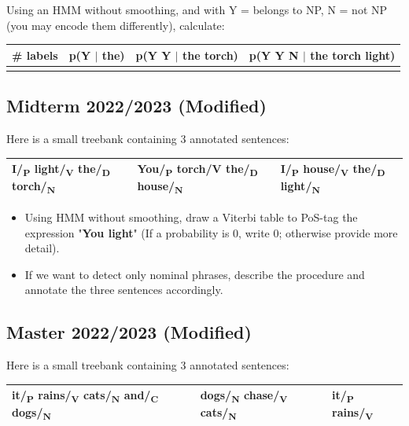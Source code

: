 \documentclass{../extra/aakpract/aakpract}
\begin{document}
	Using an HMM without smoothing, and with Y = belongs to NP, N = not NP (you may encode them differently), calculate:
	
	\begin{center}
		\begin{tabular}{|l|l|l|l|}
			\hline
			\# labels & p(Y $|$ the) & p(Y Y $|$ the torch) & p(Y Y N $|$ the torch light) \\
			\hline
			&&&\\
			\hline
		\end{tabular}
	\end{center}
	
	
	\subsection{Midterm 2022/2023 (Modified)}
	
	Here is a small treebank containing 3 annotated sentences:
	\begin{center}
		\begin{tabular}{|l|l|l|}
			\hline
			I/\textsubscript{P} light/\textsubscript{V} the/\textsubscript{D} torch/\textsubscript{N} &
			You/\textsubscript{P} torch/V the/\textsubscript{D} house/\textsubscript{N} &
			I/\textsubscript{P} house/\textsubscript{V} the/\textsubscript{D} light/\textsubscript{N} \\
			\hline
		\end{tabular}
	\end{center}
	
	\begin{itemize}
		\item Using HMM without smoothing, draw a Viterbi table to PoS-tag the expression "\textbf{You light}" (If a probability is 0, write 0; otherwise provide more detail).
		\item If we want to detect only nominal phrases, describe the procedure and annotate the three sentences accordingly.
	\end{itemize}
	
	
	\subsection{Master 2022/2023 (Modified)}
	
	Here is a small treebank containing 3 annotated sentences:
	\begin{center}
		\begin{tabular}{|l|l|l|}
			\hline
			it/\textsubscript{P} rains/\textsubscript{V} cats/\textsubscript{N} and/\textsubscript{C} dogs/\textsubscript{N} &
			dogs/\textsubscript{N} chase/\textsubscript{V} cats/\textsubscript{N} &
			it/\textsubscript{P} rains/\textsubscript{V} \\
			\hline
		\end{tabular}
	\end{center}
	
\end{document}

